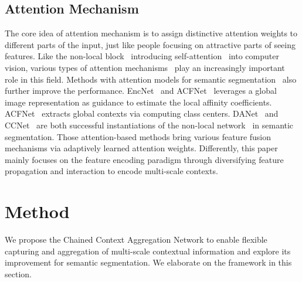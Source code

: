 \documentclass[journal]{IEEEtran}
\begin{document}
\subsection{Attention Mechanism}
The core idea of attention mechanism is to assign distinctive attention weights to different parts of the input, just like people focusing on attractive parts of seeing features. Like the non-local block~\cite{wang2018non} introducing self-attention~\cite{vaswani2017attention} into computer vision, various types of attention mechanisms~\cite{hu2018squeeze,Li_2019_CVPR,woo2018cbam,fu2017look} play an increasingly important role in this field. Methods with attention models for semantic segmentation~\cite{zhang2018context,he2019adaptive,zhao2018psanet,pang2019towards,zhang2019acfnet,fu2019dual,huang2019ccnet,zhu2019asymmetric} also further improve the performance. EncNet~\cite{zhang2018context} and ACFNet~\cite{he2019adaptive} leverages a global image representation as guidance to estimate the local affinity coefficients. ACFNet~\cite{zhang2019acfnet} extracts global contexts via computing class centers. DANet~\cite{fu2019dual} and CCNet~\cite{huang2019ccnet} are both successful instantiations of the non-local network~\cite{wang2018non} in semantic segmentation. Those attention-based methods bring various feature fusion mechanisms via adaptively learned attention weights. Differently, this paper mainly focuses on the feature encoding paradigm through diversifying feature propagation and interaction to encode multi-scale contexts.

\section{Method}
\label{section:method}
We propose the Chained Context Aggregation Network to enable flexible capturing and aggregation of multi-scale contextual information and explore its improvement for semantic segmentation. We elaborate on the framework in this section. 
\end{document}
